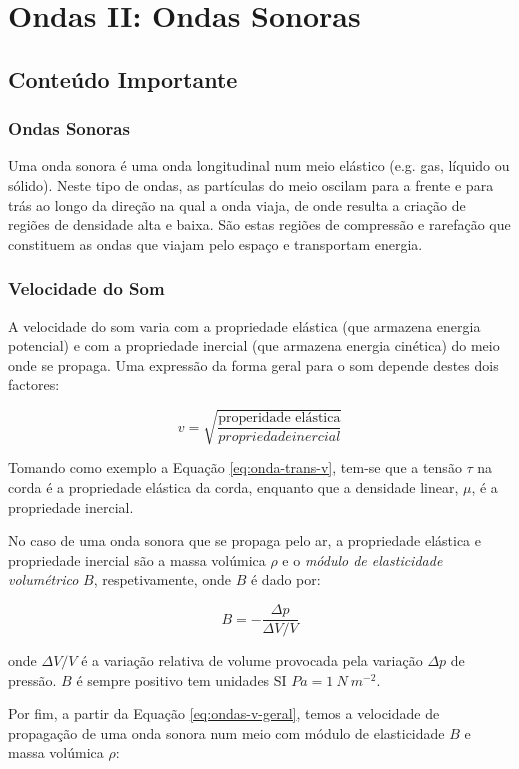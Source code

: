 \section{Ondas II: Ondas Sonoras}
\subsection{Conteúdo Importante}
\subsubsection{Ondas Sonoras}
Uma onda sonora é uma onda longitudinal num meio elástico (e.g. gas, líquido ou sólido). Neste tipo de ondas, as partículas do meio oscilam para a frente e para trás ao longo da direção na qual a onda viaja, de onde resulta a criação de regiões de densidade alta e baixa. São estas regiões de compressão e rarefação que constituem as ondas que viajam pelo espaço e transportam energia.

\subsubsection{Velocidade do Som}
A velocidade do som varia com a propriedade elástica (que armazena energia potencial) e com a propriedade inercial (que armazena energia cinética) do meio onde se propaga. Uma expressão da forma geral para o som depende destes dois factores:

\begin{equation}\label{eq:ondas-v-geral}
    v=\sqrt{\frac{\text{properidade elástica}}{propriedade inercial}}
\end{equation}

Tomando como exemplo a Equação \ref{eq:onda-trans-v}, tem-se que a tensão $\tau$ na corda é a propriedade elástica da corda, enquanto que a densidade linear, $\mu$, é a propriedade inercial.

No caso de uma onda sonora que se propaga pelo ar, a propriedade elástica e propriedade inercial são a massa volúmica $\rho$ e o \emph{módulo de elasticidade volumétrico} $B$, respetivamente, onde $B$ é dado por:

\begin{equation}
    B=-\frac{\Delta p}{\Delta V/V}
\end{equation}

onde $\Delta V/V$ é a variação relativa de volume provocada pela variação $\Delta p$ de pressão. $B$ é sempre positivo tem unidades SI $Pa=1\ N\ m^{-2}$.

Por fim, a partir da Equação \ref{eq:ondas-v-geral}, temos a velocidade de propagação de uma onda sonora num meio com módulo de elasticidade $B$ e massa volúmica $\rho$:

